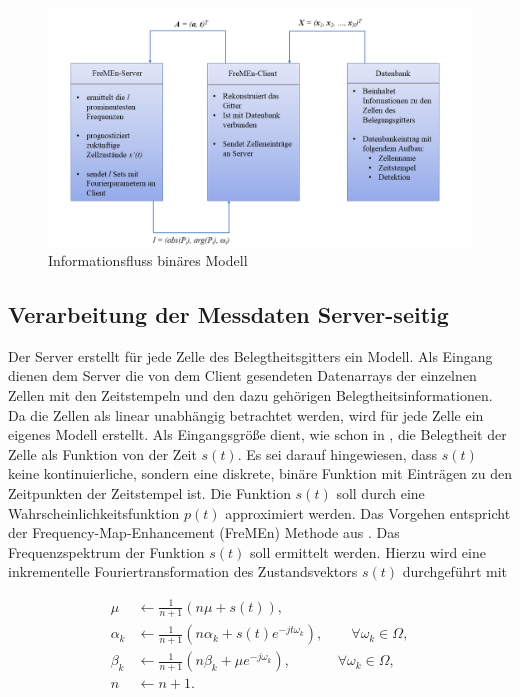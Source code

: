 \begin{figure}[!h]
	\begin{center}
		\centering
		\includegraphics[width=1.0\linewidth]{Abbildungen/methodik/Ablauf_binaer}
		\caption[Informationsfluss binäres Modell]{Informationsfluss binäres Modell}
		\label{fig.Informationsfluss_binäres_Modell}
	\end{center}
\end{figure}


\subsection{Verarbeitung der Messdaten Server-seitig}
\label{sec.Verarbeitung server binär}

Der Server erstellt für jede Zelle des Belegtheitsgitters ein Modell. Als Eingang dienen dem Server die von dem Client gesendeten Datenarrays der einzelnen Zellen mit den Zeitstempeln und den dazu gehörigen Belegtheitsinformationen. Da die Zellen als linear unabhängig betrachtet werden, wird für jede Zelle ein eigenes Modell erstellt. Als Eingangsgröße dient, wie schon in \cite{Krajnik.2014}, die Belegtheit der Zelle als Funktion von der Zeit $s(t)$. Es sei darauf hingewiesen, dass $s(t)$ keine kontinuierliche, sondern eine diskrete, binäre Funktion mit Einträgen zu den Zeitpunkten der Zeitstempel ist. Die Funktion $s(t)$ soll durch eine Wahrscheinlichkeitsfunktion $p(t)$ approximiert werden. Das Vorgehen entspricht der Frequency-Map-Enhancement (FreMEn) Methode aus \cite{Krajnik.2015b}. Das Frequenzspektrum der Funktion $s(t)$ soll ermittelt werden. Hierzu wird eine inkrementelle Fouriertransformation des Zustandsvektors $s(t)$ durchgeführt mit 

\begin{equation}\label{eq:Inkrementelle Fouriertransformation} 
	\begin{split} 
		\mu &\leftarrow \frac{1}{n+1} (n \mu + s(t)) ,\\ 
		\alpha_k &\leftarrow \frac{1}{n+1} (n \alpha_k + s(t) e^{-jt \omega_k}) ,\qquad \forall \omega_k \in \Omega ,\\ 
		\beta_k &\leftarrow \frac{1}{n+1} (n \beta_k + \mu e^{-j \omega_k}) ,\qquad \quad \, \, \forall \omega_k \in \Omega ,\\ 
		n &\leftarrow n + 1 .
	\end{split} 
\end{equation} 

